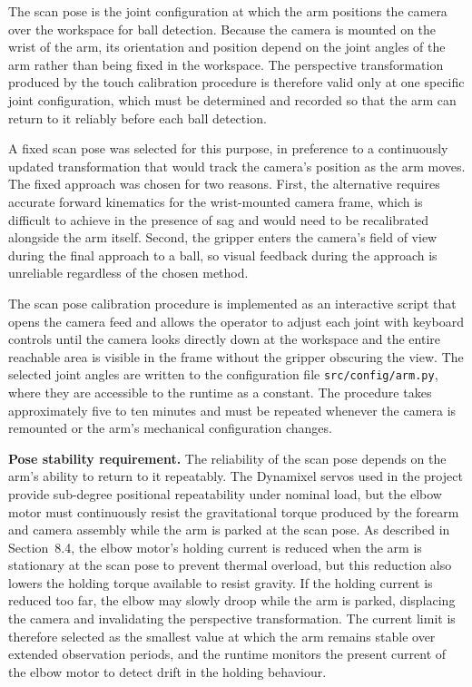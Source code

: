 
The scan pose is the joint configuration at which the arm 
positions the camera over the workspace for ball detection. 
Because the camera is mounted on the wrist of the arm, its 
orientation and position depend on the joint angles of the 
arm rather than being fixed in the workspace. The perspective 
transformation produced by the touch calibration procedure 
is therefore valid only at one specific joint configuration, 
which must be determined and recorded so that the arm can 
return to it reliably before each ball detection.

A fixed scan pose was selected for this purpose, in 
preference to a continuously updated transformation that 
would track the camera's position as the arm moves. The fixed 
approach was chosen for two reasons. First, the alternative 
requires accurate forward kinematics for the wrist-mounted 
camera frame, which is difficult to achieve in the presence 
of sag and would need to be recalibrated alongside the arm 
itself. Second, the gripper enters the camera's field of 
view during the final approach to a ball, so visual feedback 
during the approach is unreliable regardless of the chosen 
method.

The scan pose calibration procedure is implemented as an 
interactive script that opens the camera feed and allows the 
operator to adjust each joint with keyboard controls until 
the camera looks directly down at the workspace and the 
entire reachable area is visible in the frame without the 
gripper obscuring the view. The selected joint angles are 
written to the configuration file \texttt{src/config/arm.py}, 
where they are accessible to the runtime as a constant. The 
procedure takes approximately five to ten minutes and must 
be repeated whenever the camera is remounted or the arm's 
mechanical configuration changes.

\textbf{Pose stability requirement.} The reliability of the 
scan pose depends on the arm's ability to return to it 
repeatably. The Dynamixel servos used in the project provide 
sub-degree positional repeatability under nominal load, but 
the elbow motor must continuously resist the gravitational 
torque produced by the forearm and camera assembly while the 
arm is parked at the scan pose. As described in Section~8.4, 
the elbow motor's holding current is reduced when the arm is 
stationary at the scan pose to prevent thermal overload, but 
this reduction also lowers the holding torque available to 
resist gravity. If the holding current is reduced too far, 
the elbow may slowly droop while the arm is parked, 
displacing the camera and invalidating the perspective 
transformation. The current limit is therefore selected as 
the smallest value at which the arm remains stable over 
extended observation periods, and the runtime monitors the 
present current of the elbow motor to detect drift in the 
holding behaviour.